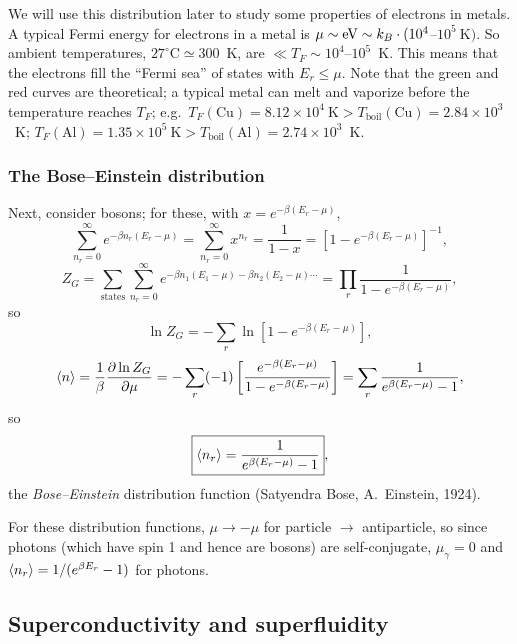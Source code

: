 We will use this distribution later to study some properties of electrons in metals. A typical Fermi energy for electrons
in a metal is $\mu\sim\text{eV}\sim k_{B}\cdot(10^4$--$10^5\ \text{K})$. So ambient temperatures, $27^\circ\text{C}\simeq 300$~K,
are $\ll T_F\sim 10^4$--$10^5$~K. This means that the electrons fill the ``Fermi sea'' of states with $E_r\le\mu$. Note that
the green and red curves are theoretical; a typical metal can melt and vaporize before the temperature reaches $T_F$; e.g.\
$T_F(\text{Cu}) = 8.12\times 10^4\ \text{K}>T_{\text{boil}}(\text{Cu}) = 2.84\times 10^3$~K;
$T_F(\text{Al}) = 1.35\times 10^5\ \text{K}>T_{\text{boil}}(\text{Al}) = 2.74\times 10^3$~K.

\subsubsection*{The Bose--Einstein distribution}

Next, consider bosons; for these, with $x = e^{-\beta(E_r-\mu)}$,
\begin{equation}
  \sum_{n_r=0}^\infty e^{-\beta n_r(E_r-\mu)} = \sum_{n_r=0}^\infty x^{n_r} = \frac{1}{1-x} = \left[1-e^{-\beta(E_r-\mu)}\right]^{-1},
\end{equation}
\begin{equation}
  Z_G = \sum_{\text{states}}\sum_{n_r=0}^\infty e^{-\beta n_1(E_1-\mu)-\beta n_2(E_2-\mu)\cdots}
      = \prod_r\frac{1}{1-e^{-\beta(E_r-\mu)}},
\end{equation}
so
\begin{equation}
  \ln Z_G = -\sum_r\ln\left[1-e^{-\beta(E_r-\mu)}\right],
\end{equation}
\begin{equation}
  \langle n\rangle = \frac{1}{\beta}\frac{\partial\ln Z_G}{\partial\mu} = -\sum_r(-1)\left[\frac{e^{-\beta(E_r-\mu)}}{1-e^{-\beta(E_r-\mu)}}\right]
        = \sum_r\frac{1}{e^{\beta(E_r-\mu)}-1},
\end{equation}
so
\begin{equation}
  \boxed{\langle n_r\rangle = \frac{1}{e^{\beta(E_r-\mu)}-1}},
\end{equation}
the \emph{Bose--Einstein} distribution function (Satyendra Bose, A.~Einstein, 1924).

For these distribution functions, $\mu\to-\mu$ for particle $\to$ antiparticle, so since photons (which have spin 1 and
hence are bosons) are self-conjugate, $\mu_\gamma = 0$ and $\langle n_r\rangle = 1/(e^{\beta E_r}-1)$ for photons.

\subsection{Superconductivity and superfluidity}
